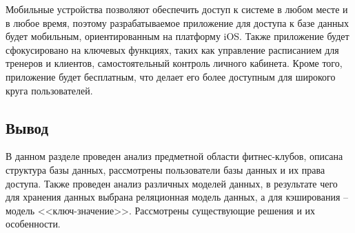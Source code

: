 Мобильные устройства позволяют обеспечить доступ к системе в любом месте и в любое время, поэтому разрабатываемое приложение для доступа к базе данных будет мобильным, ориентированным на платформу iOS. Также приложение будет сфокусировано на ключевых функциях, таких как управление расписанием для тренеров и клиентов, самостоятельный контроль личного кабинета. Кроме того, приложение будет бесплатным, что делает его более доступным для широкого круга пользователей. 

\subsection*{Вывод}

В данном разделе проведен анализ предметной области фитнес-клубов, описана структура базы данных, рассмотрены пользователи базы данных и их права доступа. Также проведен анализ различных моделей данных, в результате чего для хранения данных выбрана реляционная модель данных, а для кэширования -- модель <<ключ-значение>>. Рассмотрены существующие решения и их особенности.
